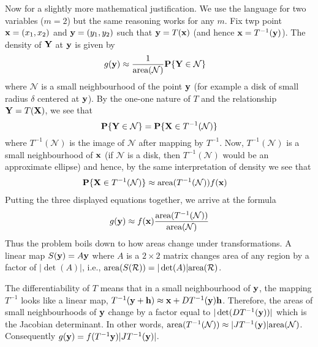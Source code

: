 \documentclass[preprint,  11pt]{amsart}
\def\h{{\bf h}}
\def\X{{\bf X}}
\def\Y{{\bf Y}}
\begin{document}
Now for a slightly more mathematical justification. We use the language for two variables ($m=2$) but the same reasoning works for any $m$. Fix twp point $\mathbf{x}=(x_{1},x_{2})$ and $\mathbf{y}=(y_{1},y_{2})$ such that $\mathbf{y}=T(\mathbf{x})$ (and hence $\mathbf{x}=T^{-1}(\mathbf{y})$). The density of $\Y$ at $\mathbf{y}$ is given by
\begin{align*}
g(\y)&\approx \frac{1}{\mb{area}(\mathcal N)}\P\{\Y\in \mathcal N\}
\end{align*}
where $\mathcal N$ is a small neighbourhood of the point $\mathbf{y}$ (for example a disk of small radius $\delta$ centered at $\mathbf{y}$). By the one-one nature of $T$ and the relationship $\Y=T(\X)$, we see that $$\P\{\Y\in \mathcal N\}=\P\{\X\in T^{-1}(\mathcal N)\}$$ where $T^{-1}(\mathcal N)$ is the image of $\mathcal N$ after mapping by $T^{-1}$.  Now, $T^{-1}(\mathcal N)$ is a small neighbourhood of $\mathbf{x}$ (if $\mathcal N$ is a disk, then $T^{-1}(\mathcal N)$ would be an approximate ellipse) and hence, by the same interpretation of density we see that
\begin{align*}
\P\{\X\in T^{-1}(\mathcal N)\}&\approx \mb{area}(T^{-1}(\mathcal N))f(\x)
\end{align*}
Putting the three displayed equations together, we arrive at the formula
$$
g(\mathbf{y})\approx f(\mathbf{x})\frac{\mbox{area}(T^{-1}(\mathcal N))}{\mbox{area}(\mathcal N)}
$$
Thus the problem boils down to how areas change under transformations. A linear map $S(\mathbf{y})=A\mathbf{y}$ where $A$ is a $2\times 2$ matrix changes area of any region by a factor of $|\det(A)|$, i.e., $\mbox{area}(S(\mathcal R))=|\det(A)|\mbox{area}(\mathcal R)$.

The differentiability of $T$ means that in a small neighbourhood of $\mathbf{y}$, the mapping $T^{-1}$ looks like a linear map, $T^{-1}(\y+\mathbf h)\approx \x+DT^{-1}(\y)\h$. Therefore, the areas of small neighbourhoods of $\mathbf{y}$ change by a factor equal to $|\det(DT^{-1}(\mathbf{y}))|$ which is the Jacobian determinant. In other words, $\mbox{area}(T^{-1}(\mathcal N))\approx |JT^{-1}(\mathbf{y})|\mbox{area}(\mathcal N)$. Consequently $g(\mathbf{y})=f(T^{-1}\mathbf{y})|JT^{-1}(\mathbf{y})|$.
\end{document}
